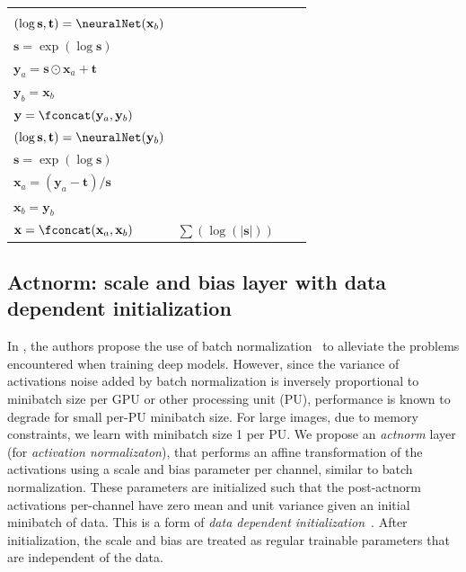 \documentclass{article}
\newcommand{\bb}[1]{\mathbf{#1}}
\newcommand{\bx}{\bb{x}}
\newcommand{\bt}{\bb{t}}
\newcommand{\by}{\bb{y}}
\newcommand{\bs}{\mathbf{s}}
\begin{document}
\begin{table}
\begin{tabularx}{\textwidth}{ X | X | X | l}
    &
    \begin{tabular}[t]{@{}l@{}}
    $\bx_a, \bx_b = \fsplit(\bx)$\\
    $(\log \bs, \bt) = \neuralNet(\bx_b)$\\
    $\bs = \exp(\log \bs)$\\
    $\by_a = \bs \odot \bx_a + \bt$\\
    $\by_b = \bx_b$\\
    $\by = \fconcat(\by_a, \by_b)$
    \end{tabular}
    &
    \begin{tabular}[t]{@{}l@{}}
    $\by_a, \by_b = \fsplit(\by)$\\
    $(\log \bs, \bt) = \neuralNet(\by_b)$\\
    $\bs = \exp(\log \bs)$\\
    $\bx_a = (\by_a - \bt) / \bs$\\
    $\bx_b = \by_b$\\
    $\bx = \fconcat(\bx_a, \bx_b)$
    \end{tabular}
    &
    $\sum(\log(|\bs|))$
    \\\bottomrule
  \end{tabularx}
\end{table}




\subsection{Actnorm: scale and bias layer with data dependent initialization}
\label{sec:actnorm}

In \cite{dinh2016density}, the authors propose the use of batch normalization~\citep{ioffe2015batch} to alleviate the problems encountered when training deep models. However, since the variance of activations noise added by batch normalization is inversely proportional to minibatch size per GPU or other processing unit (PU), performance is known to degrade for small per-PU minibatch size. For large images, due to memory constraints, we learn with minibatch size 1 per PU. We propose an \emph{actnorm} layer (for \emph{activation normalizaton}), that performs an affine transformation of the activations using a scale and bias parameter per channel, similar to batch normalization. These parameters are initialized such that the post-actnorm activations per-channel have zero mean and unit variance given an initial minibatch of data. This is a form of \emph{data dependent initialization}~\citep{salimans2016weight}. After initialization, the scale and bias are treated as regular trainable parameters that are independent of the data.
\end{document}
